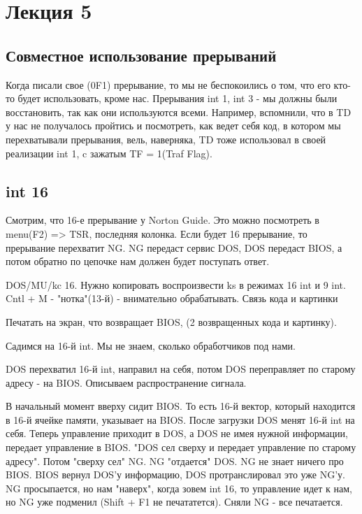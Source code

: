 \section{Лекция 5}
\subsection{Совместное использование прерываний}
Когда писали свое (0F1) прерывание, то мы не беспокоились о том, что его кто-то будет использовать, кроме нас. Прерывания int 1, int 3 - мы должны были восстановить, так как они используются всеми. Например, вспомнили, что в TD у нас не получалось пройтись и посмотреть, как ведет себя код, в котором мы перехватывали прерывания, вель, наверняка, TD тоже использовал в своей реализации int 1, c зажатым TF = 1(Traf Flag).

\subsection{int 16}
Смотрим, что 16-е прерывание у Norton Guide. Это можно посмотреть в menu(F2) => TSR, последняя колонка. Если будет 16 прерывание, то прерывание перехватит NG. NG передаст сервис DOS, DOS передаст BIOS, а потом обратно по цепочке нам должен будет поступать ответ. 

\begin{hw} DOS/MU/kc 16. Нужно копировать воспроизвести ks в режимах 16 int и  9 int. Cntl + M - "нотка"(13-й) - внимательно обрабатывать. Связь кода и картинки\end{hw} 
Печатать на экран, что возвращает BIOS, (2 возвращенных кода и картинку).

\begin{rem}Садимся на 16-й int. Мы не знаем, сколько обработчиков под нами.\end{rem}
DOS перехватил 16-й int, направил на себя, потом DOS переправляет по старому адресу - на BIOS. Описываем распространение сигнала. 

В начальный момент вверху сидит BIOS. То есть 16-й вектор, который находится в 16-й ячейке памяти, указывает на BIOS. После загрузки DOS менят 16-й int на себя. Теперь управление приходит в DOS, а DOS не имея нужной информации,  передает управление в BIOS. "DOS сел сверху и передает управление по старому адресу". Потом "сверху сел"  NG. NG "отдается" DOS. NG не знает ничего про BIOS. BIOS вернул DOS'у информацию, DOS протранслировал это уже NG'у. NG просыпается, но нам "наверх", когда зовем int 16, то управление идет к нам, но NG уже подменил (Shift + F1 не печататется). Сняли NG - все печатается.  

